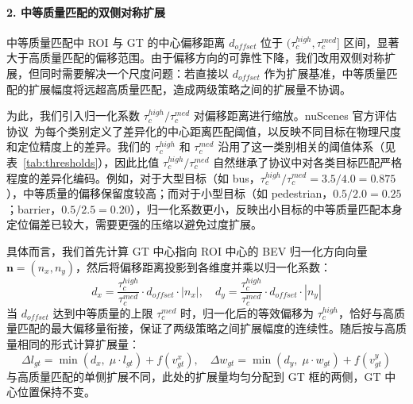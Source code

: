 \documentclass[12pt, UTF8]{ctexart}
\begin{document}
\paragraph{2. 中等质量匹配的双侧对称扩展}
中等质量匹配中 ROI 与 GT 的中心偏移距离 $d_{offset}$ 位于 $(\tau^{high}_c, \tau^{med}_c]$ 区间，显著大于高质量匹配的偏移范围。由于偏移方向的可靠性下降，我们改用双侧对称扩展，但同时需要解决一个尺度问题：若直接以 $d_{offset}$ 作为扩展基准，中等质量匹配的扩展幅度将远超高质量匹配，造成两级策略之间的扩展量不协调。

为此，我们引入归一化系数 $\tau^{high}_c / \tau^{med}_c$ 对偏移距离进行缩放。nuScenes 官方评估协议~\cite{nuscenes}为每个类别定义了差异化的中心距离匹配阈值，以反映不同目标在物理尺度和定位精度上的差异。我们的 $\tau^{high}_c$ 和 $\tau^{med}_c$ 沿用了这一类别相关的阈值体系（见表~\ref{tab:thresholds}），因此比值 $\tau^{high}_c / \tau^{med}_c$ 自然继承了协议中对各类目标匹配严格程度的差异化编码。例如，对于大型目标（如 bus，$\tau^{high}_c / \tau^{med}_c = 3.5/4.0 = 0.875$），中等质量的偏移保留度较高；而对于小型目标（如 pedestrian，$0.5/2.0 = 0.25$；barrier，$0.5/2.5 = 0.20$），归一化系数更小，反映出小目标的中等质量匹配本身定位偏差已较大，需要更强的压缩以避免过度扩展。

具体而言，我们首先计算 GT 中心指向 ROI 中心的 BEV 归一化方向向量 $\mathbf{n} = (n_x, n_y)$，然后将偏移距离投影到各维度并乘以归一化系数：
\begin{equation}
d_x = \frac{\tau^{high}_c}{\tau^{med}_c} \cdot d_{offset} \cdot |n_x|, \quad
d_y = \frac{\tau^{high}_c}{\tau^{med}_c} \cdot d_{offset} \cdot |n_y|
\end{equation}
当 $d_{offset}$ 达到中等质量的上限 $\tau^{med}_c$ 时，归一化后的等效偏移为 $\tau^{high}_c$，恰好与高质量匹配的最大偏移量衔接，保证了两级策略之间扩展幅度的连续性。随后按与高质量相同的形式计算扩展量：
\begin{equation}
\Delta l_{gt} = \min(d_x,\; \mu \cdot l_{gt}) + f(v_{gt}^x), \quad
\Delta w_{gt} = \min(d_y,\; \mu \cdot w_{gt}) + f(v_{gt}^y)
\end{equation}
与高质量匹配的单侧扩展不同，此处的扩展量均匀分配到 GT 框的两侧，GT 中心位置保持不变。
\end{document}
